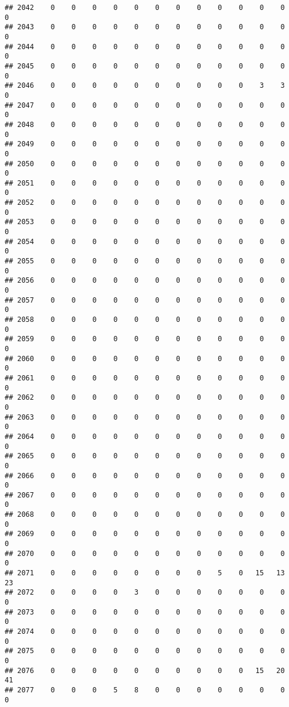 \documentclass[]{article}
\begin{document}
\begin{verbatim}
## 2042    0    0    0    0    0    0    0    0    0    0    0    0    0
## 2043    0    0    0    0    0    0    0    0    0    0    0    0    0
## 2044    0    0    0    0    0    0    0    0    0    0    0    0    0
## 2045    0    0    0    0    0    0    0    0    0    0    0    0    0
## 2046    0    0    0    0    0    0    0    0    0    0    3    3    0
## 2047    0    0    0    0    0    0    0    0    0    0    0    0    0
## 2048    0    0    0    0    0    0    0    0    0    0    0    0    0
## 2049    0    0    0    0    0    0    0    0    0    0    0    0    0
## 2050    0    0    0    0    0    0    0    0    0    0    0    0    0
## 2051    0    0    0    0    0    0    0    0    0    0    0    0    0
## 2052    0    0    0    0    0    0    0    0    0    0    0    0    0
## 2053    0    0    0    0    0    0    0    0    0    0    0    0    0
## 2054    0    0    0    0    0    0    0    0    0    0    0    0    0
## 2055    0    0    0    0    0    0    0    0    0    0    0    0    0
## 2056    0    0    0    0    0    0    0    0    0    0    0    0    0
## 2057    0    0    0    0    0    0    0    0    0    0    0    0    0
## 2058    0    0    0    0    0    0    0    0    0    0    0    0    0
## 2059    0    0    0    0    0    0    0    0    0    0    0    0    0
## 2060    0    0    0    0    0    0    0    0    0    0    0    0    0
## 2061    0    0    0    0    0    0    0    0    0    0    0    0    0
## 2062    0    0    0    0    0    0    0    0    0    0    0    0    0
## 2063    0    0    0    0    0    0    0    0    0    0    0    0    0
## 2064    0    0    0    0    0    0    0    0    0    0    0    0    0
## 2065    0    0    0    0    0    0    0    0    0    0    0    0    0
## 2066    0    0    0    0    0    0    0    0    0    0    0    0    0
## 2067    0    0    0    0    0    0    0    0    0    0    0    0    0
## 2068    0    0    0    0    0    0    0    0    0    0    0    0    0
## 2069    0    0    0    0    0    0    0    0    0    0    0    0    0
## 2070    0    0    0    0    0    0    0    0    0    0    0    0    0
## 2071    0    0    0    0    0    0    0    0    5    0   15   13   23
## 2072    0    0    0    0    3    0    0    0    0    0    0    0    0
## 2073    0    0    0    0    0    0    0    0    0    0    0    0    0
## 2074    0    0    0    0    0    0    0    0    0    0    0    0    0
## 2075    0    0    0    0    0    0    0    0    0    0    0    0    0
## 2076    0    0    0    0    0    0    0    0    0    0   15   20   41
## 2077    0    0    0    5    8    0    0    0    0    0    0    0    0

\end{verbatim}
\end{document}
